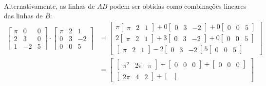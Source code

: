 \documentclass[12pt,a4paper]{article}
\begin{document}
\begin{enumerate}
\begin{enumerate}
Alternativamente, as linhas de $AB$ podem ser obtidas como combinações lineares das linhas de $B$:
\begin{align*}
\begin{bmatrix}
\pi & 0 & 0 \\
  2 & 3 & 0 \\
  1 & -2 & 5
\end{bmatrix}
\cdot
\begin{bmatrix}
\pi & 2 & 1 \\
 0 & 3 & -2 \\
 0 & 0 & 5
\end{bmatrix}
& =
\begin{bmatrix}
\pi
\begin{bmatrix}
\pi & 2 & 1
\end{bmatrix}
+0
\begin{bmatrix}
 0 & 3 & -2
\end{bmatrix}
+0
\begin{bmatrix}
 0 & 0 & 5
\end{bmatrix} \\
2
\begin{bmatrix}
\pi & 2 & 1
\end{bmatrix}
+3
\begin{bmatrix}
 0 & 3 & -2
\end{bmatrix}
+0
\begin{bmatrix}
 0 & 0 & 5
\end{bmatrix}\\
\begin{bmatrix}
\pi & 2 & 1
\end{bmatrix}
-2
\begin{bmatrix}
 0 & 3 & -2
\end{bmatrix}
5
\begin{bmatrix}
 0 & 0 & 5
\end{bmatrix}
\end{bmatrix} \\
& =
\begin{bmatrix}
\begin{bmatrix}
\pi^2 & 2\pi & \pi
\end{bmatrix}
+
\begin{bmatrix}
 0 & 0 & 0
\end{bmatrix}
+
\begin{bmatrix}
 0 & 0 & 0
\end{bmatrix}
\\
\begin{bmatrix}
2\pi & 4 & 2
\end{bmatrix}
+
\begin{bmatrix}

\end{bmatrix}
\end{bmatrix}
\end{align*}
\end{enumerate}
\end{enumerate}
\end{document}
